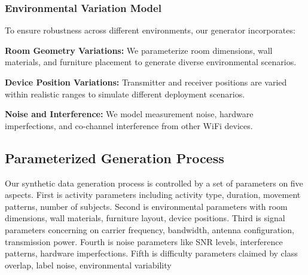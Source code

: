 \documentclass[journal]{IEEEtran}
\begin{document}
\subsubsection{Environmental Variation Model}

To ensure robustness across different environments, our generator incorporates:

\textbf{Room Geometry Variations:} We parameterize room dimensions, wall materials, and furniture placement to generate diverse environmental scenarios.

\textbf{Device Position Variations:} Transmitter and receiver positions are varied within realistic ranges to simulate different deployment scenarios.

\textbf{Noise and Interference:} We model measurement noise, hardware imperfections, and co-channel interference from other WiFi devices.

\subsection{Parameterized Generation Process}

Our synthetic data generation process is controlled by a set of parameters on five aspects. First is activity parameters including activity type, duration, movement patterns, number of subjects. Second is environmental parameters with room dimensions, wall materials, furniture layout, device positions. Third is signal parameters concerning on carrier frequency, bandwidth, antenna configuration, transmission power. Fourth is noise parameters like SNR levels, interference patterns, hardware imperfections. Fifth is difficulty parameters claimed by class overlap, label noise, environmental variability
\end{document}
